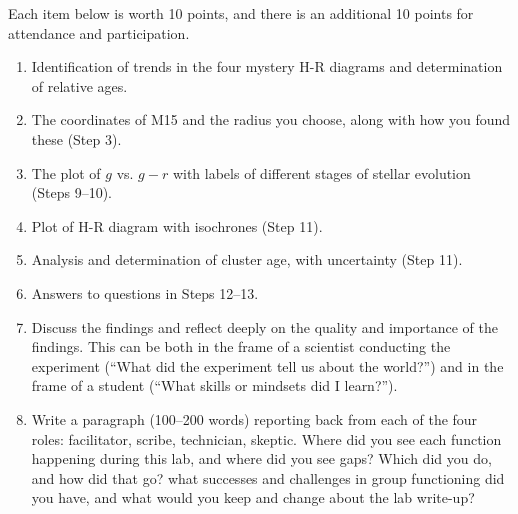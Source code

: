 Each item below is worth 10 points, and there is an additional 10 points for attendance and participation.

\begin{enumerate}
	\item Identification of trends in the four mystery H-R diagrams and determination of relative ages.

	\item The coordinates of M15 and the radius you choose, along with how you found these (Step 3).
	
	\item The plot of $g$ vs. $g-r$ with labels of different stages of stellar evolution (Steps 9--10).
	
	\item Plot of H-R diagram with isochrones (Step 11).
	
	\item Analysis and determination of cluster age, with uncertainty (Step 11).
	
	\item Answers to questions in Steps 12--13.
	
	\item Discuss the findings and reflect deeply on the quality and importance of the findings. This can be both in the frame of a scientist conducting the experiment (“What did the experiment tell us about the world?”) and in the frame of a student (“What skills or mindsets did I learn?”).
	
	\item Write a paragraph (100--200 words) reporting back from each of the four roles: facilitator, scribe, technician, skeptic. Where did you see each function happening during this lab, and where did you see gaps? Which did you do, and how did that go? what successes and	challenges in group functioning did you have, and what would you keep and change about the lab write-up?
\end{enumerate}

